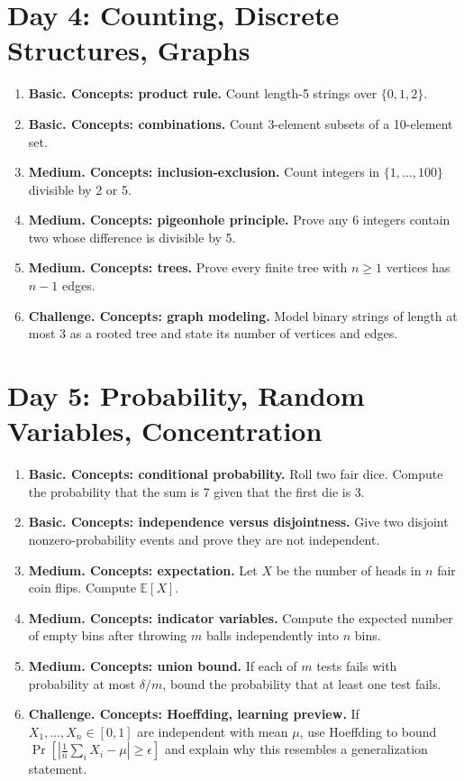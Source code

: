 \documentclass[11pt]{article}
\begin{document}
\section{Day 4: Counting, Discrete Structures, Graphs}
\begin{enumerate}[label=\textbf{4.\arabic*.}]
\item \textbf{Basic. Concepts: product rule.} Count length-5 strings over $\{0,1,2\}$.
\item \textbf{Basic. Concepts: combinations.} Count 3-element subsets of a 10-element set.
\item \textbf{Medium. Concepts: inclusion-exclusion.} Count integers in $\{1,\ldots,100\}$ divisible by 2 or 5.
\item \textbf{Medium. Concepts: pigeonhole principle.} Prove any 6 integers contain two whose difference is divisible by 5.
\item \textbf{Medium. Concepts: trees.} Prove every finite tree with $n\ge1$ vertices has $n-1$ edges.
\item \textbf{Challenge. Concepts: graph modeling.} Model binary strings of length at most 3 as a rooted tree and state its number of vertices and edges.
\end{enumerate}

\section{Day 5: Probability, Random Variables, Concentration}
\begin{enumerate}[label=\textbf{5.\arabic*.}]
\item \textbf{Basic. Concepts: conditional probability.} Roll two fair dice. Compute the probability that the sum is 7 given that the first die is 3.
\item \textbf{Basic. Concepts: independence versus disjointness.} Give two disjoint nonzero-probability events and prove they are not independent.
\item \textbf{Medium. Concepts: expectation.} Let $X$ be the number of heads in $n$ fair coin flips. Compute $\mathbb{E}[X]$.
\item \textbf{Medium. Concepts: indicator variables.} Compute the expected number of empty bins after throwing $m$ balls independently into $n$ bins.
\item \textbf{Medium. Concepts: union bound.} If each of $m$ tests fails with probability at most $\delta/m$, bound the probability that at least one test fails.
\item \textbf{Challenge. Concepts: Hoeffding, learning preview.} If $X_1,\ldots,X_n\in[0,1]$ are independent with mean $\mu$, use Hoeffding to bound $\Pr[|\frac1n\sum_i X_i-\mu|\ge\epsilon]$ and explain why this resembles a generalization statement.
\end{enumerate}
\end{document}
